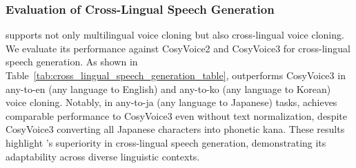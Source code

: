 \subsubsection{Evaluation of Cross-Lingual Speech Generation}
\method supports not only multilingual voice cloning but also cross-lingual voice cloning. We evaluate its performance against CosyVoice2 and CosyVoice3 for cross-lingual speech generation. As shown in Table~\ref{tab:cross_lingual_speech_generation_table}, \method outperforms CosyVoice3 in any-to-en (any language to English) and any-to-ko (any language to Korean) voice cloning. Notably, in any-to-ja (any language to Japanese) tasks, \method achieves comparable performance to CosyVoice3 even without text normalization, despite CosyVoice3 converting all Japanese characters into phonetic kana. These results highlight \method's superiority in cross-lingual speech generation, demonstrating its adaptability across diverse linguistic contexts.


